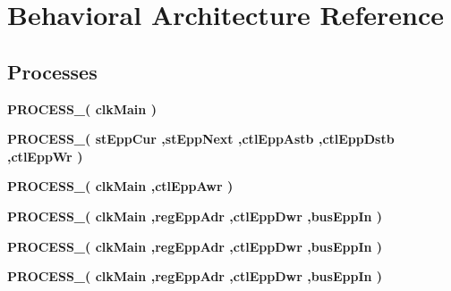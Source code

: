 \section{Behavioral Architecture Reference}
\label{classdpimref_1_1_behavioral}
\subsection*{Processes}
 \begin{DoxyCompactItemize}
\item 
{\bf P\-R\-O\-C\-E\-S\-S\-\_}{\bfseries  ( {\bfseries {\bfseries {\bf clk\-Main}} \textcolor{vhdlchar}{ }\textcolor{vhdlchar}{ }} )}
\item 
{\bf P\-R\-O\-C\-E\-S\-S\-\_}{\bfseries  ( {\bfseries {\bfseries {\bf st\-Epp\-Cur}} \textcolor{vhdlchar}{ }\textcolor{vhdlchar}{ }\textcolor{vhdlchar}{,}{\bfseries {\bf st\-Epp\-Next}} \textcolor{vhdlchar}{ }\textcolor{vhdlchar}{,}{\bfseries {\bf ctl\-Epp\-Astb}} \textcolor{vhdlchar}{ }\textcolor{vhdlchar}{,}{\bfseries {\bf ctl\-Epp\-Dstb}} \textcolor{vhdlchar}{ }\textcolor{vhdlchar}{,}{\bfseries {\bf ctl\-Epp\-Wr}} \textcolor{vhdlchar}{ }} )}
\item 
{\bf P\-R\-O\-C\-E\-S\-S\-\_}{\bfseries  ( {\bfseries {\bfseries {\bf clk\-Main}} \textcolor{vhdlchar}{ }\textcolor{vhdlchar}{ }\textcolor{vhdlchar}{,}{\bfseries {\bf ctl\-Epp\-Awr}} \textcolor{vhdlchar}{ }} )}
\item 
{\bf P\-R\-O\-C\-E\-S\-S\-\_}{\bfseries  ( {\bfseries {\bfseries {\bf clk\-Main}} \textcolor{vhdlchar}{ }\textcolor{vhdlchar}{ }\textcolor{vhdlchar}{,}{\bfseries {\bf reg\-Epp\-Adr}} \textcolor{vhdlchar}{ }\textcolor{vhdlchar}{,}{\bfseries {\bf ctl\-Epp\-Dwr}} \textcolor{vhdlchar}{ }\textcolor{vhdlchar}{,}{\bfseries {\bf bus\-Epp\-In}} \textcolor{vhdlchar}{ }} )}
\item 
{\bf P\-R\-O\-C\-E\-S\-S\-\_}{\bfseries  ( {\bfseries {\bfseries {\bf clk\-Main}} \textcolor{vhdlchar}{ }\textcolor{vhdlchar}{ }\textcolor{vhdlchar}{,}{\bfseries {\bf reg\-Epp\-Adr}} \textcolor{vhdlchar}{ }\textcolor{vhdlchar}{,}{\bfseries {\bf ctl\-Epp\-Dwr}} \textcolor{vhdlchar}{ }\textcolor{vhdlchar}{,}{\bfseries {\bf bus\-Epp\-In}} \textcolor{vhdlchar}{ }} )}
\item 
{\bf P\-R\-O\-C\-E\-S\-S\-\_}{\bfseries  ( {\bfseries {\bfseries {\bf clk\-Main}} \textcolor{vhdlchar}{ }\textcolor{vhdlchar}{ }\textcolor{vhdlchar}{,}{\bfseries {\bf reg\-Epp\-Adr}} \textcolor{vhdlchar}{ }\textcolor{vhdlchar}{,}{\bfseries {\bf ctl\-Epp\-Dwr}} \textcolor{vhdlchar}{ }\textcolor{vhdlchar}{,}{\bfseries {\bf bus\-Epp\-In}} \textcolor{vhdlchar}{ }} )}

\end{DoxyCompactItemize}
